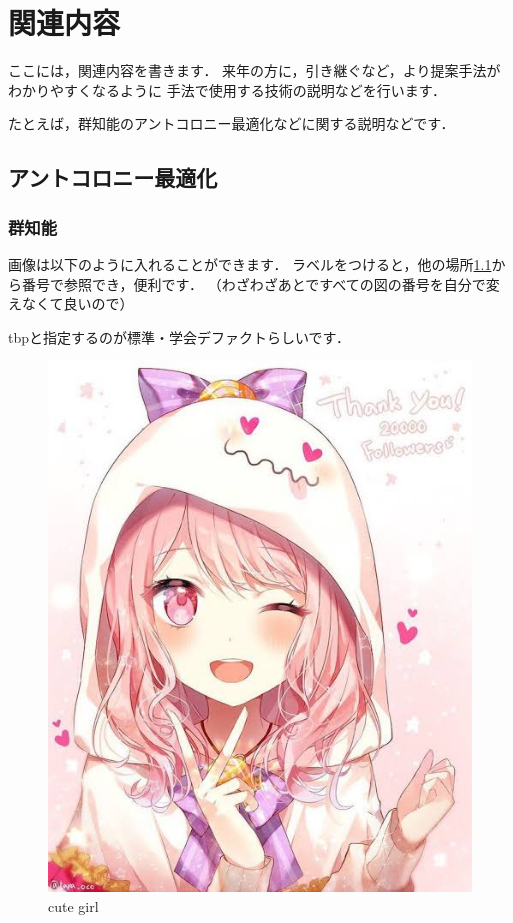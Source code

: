 \chapter{関連内容}

ここには，関連内容を書きます．
来年の方に，引き継ぐなど，より提案手法がわかりやすくなるように
手法で使用する技術の説明などを行います．

たとえば，群知能のアントコロニー最適化などに関する説明などです．


\section{アントコロニー最適化}


\subsection{群知能}

画像は以下のように入れることができます．
ラベルをつけると，他の場所\ref{fig:cute}から番号で参照でき，便利です．
（わざわざあとですべての図の番号を自分で変えなくて良いので）

tbpと指定するのが標準・学会デファクトらしいです．

\begin{figure}[tbp]
    \begin{center}
        \includegraphics[width=0.8\linewidth]{images/chapter3/cute.jpeg}
    \end{center}
    \caption{cute girl}
    \label{fig:cute}
\end{figure}

